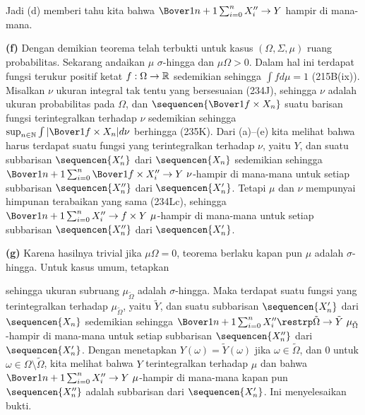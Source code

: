 {\noindent Jadi (d) memberi tahu kita bahwa
$\Bover1{n+1}\sum_{i=0}^nX''_i\to Y$ hampir di mana-mana.

\medskip

{\bf (f)} Dengan demikian teorema telah terbukti untuk kasus
$(\Omega,\Sigma,\mu)$ ruang probabilitas. Sekarang andaikan $\mu$
$\sigma$-hingga dan $\mu\Omega>0$. Dalam hal ini terdapat fungsi terukur
positif ketat $f:\Omega\to\Bbb R$ sedemikian sehingga $\int fd\mu=1$
(215B(ix)). Misalkan $\nu$ ukuran integral tak tentu yang bersesuaian
(234J), sehingga $\nu$ adalah ukuran probabilitas pada $\Omega$, dan
$\sequencen{\Bover1f\times X_n}$ suatu barisan fungsi terintegralkan
terhadap $\nu$ sedemikian sehingga
$\sup_{n\in\Bbb N}\int|\Bover1f\times X_n|d\nu$ berhingga (235K). Dari
(a)--(e) kita melihat bahwa harus terdapat suatu fungsi yang terintegralkan
terhadap $\nu$, yaitu $Y$, dan suatu subbarisan $\sequencen{X'_n}$ dari
$\sequencen{X_n}$ sedemikian sehingga
$\Bover1{n+1}\sum_{i=0}^n\Bover1f\times X''_i\to Y\,\,\nu$-hampir di
mana-mana untuk setiap subbarisan $\sequencen{X''_n}$ dari
$\sequencen{X'_n}$. Tetapi $\mu$ dan $\nu$ mempunyai himpunan terabaikan
yang sama (234Lc), sehingga
$\Bover1{n+1}\sum_{i=0}^nX''_i\to f\times Y\,\,\mu$-hampir di mana-mana
untuk setiap subbarisan $\sequencen{X''_n}$ dari $\sequencen{X'_n}$.

\medskip

{\bf (g)} Karena hasilnya trivial jika $\mu\Omega=0$, teorema berlaku
kapan pun $\mu$ adalah $\sigma$-hingga. Untuk kasus umum, tetapkan


\noindent sehingga ukuran subruang $\mu_{\tilde\Omega}$ adalah
$\sigma$-hingga. Maka terdapat suatu fungsi yang terintegralkan terhadap
$\mu_{\tilde\Omega}$, yaitu $\tilde Y$, dan suatu subbarisan
$\sequencen{X'_n}$ dari $\sequencen{X_n}$ sedemikian sehingga
$\Bover1{n+1}\sum_{i=0}^nX''_i\restrp\tilde\Omega\to\tilde Y\,\,
\mu_{\tilde\Omega}$-hampir di mana-mana untuk setiap subbarisan
$\sequencen{X''_n}$ dari $\sequencen{X'_n}$. Dengan menetapkan
$Y(\omega)=\tilde Y(\omega)$ jika $\omega\in\tilde\Omega$, dan $0$ untuk
$\omega\in\Omega\setminus\tilde\Omega$, kita melihat bahwa $Y$
terintegralkan terhadap $\mu$ dan bahwa
$\Bover1{n+1}\sum_{i=0}^nX''_i\to Y\,\,\mu$-hampir di mana-mana kapan
pun $\sequencen{X''_n}$ adalah subbarisan dari $\sequencen{X'_n}$.
Ini menyelesaikan bukti.
}%

